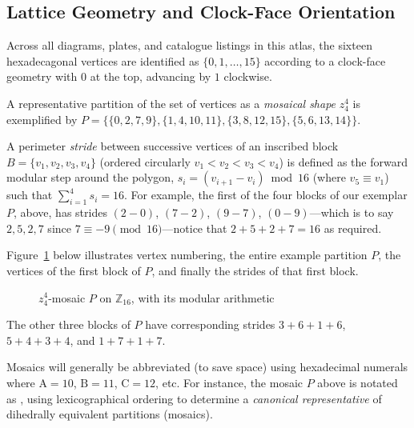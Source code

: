 \subsection{Lattice Geometry and Clock-Face Orientation}
\label{sec:clock-face-orientation}

Across all diagrams, plates, and catalogue listings in this atlas, the sixteen hexadecagonal vertices are identified as $\{0, 1, \dots, 15\}$ according to a clock-face geometry with $0$ at the top, advancing by $1$ clockwise.

A representative partition of the set of vertices as a \textit{mosaical shape} $z_4^4$ is exemplified by $P = \{\{0, 2, 7, 9\}, \{1, 4, 10, 11\}, \{3, 8, 12, 15\}, \{5, 6, 13, 14\}\}$.

A perimeter \textit{stride} between successive vertices of an inscribed block $B = \{v_1, v_2, v_3, v_4\}$ (ordered circularly $v_1 < v_2 < v_3 < v_4$) is defined as the forward modular step around the polygon, $s_i = (v_{i+1} - v_i) \bmod 16$ (where $v_5 \equiv v_1$) such that $\sum_{i=1}^4 s_i = 16$. For example, the first of the four blocks of our exemplar $P$, above, has strides $(2 - 0)$, $(7 - 2)$, $(9 - 7)$, $(0 - 9)$---which is to say $2, 5, 2, 7$ since $7 \equiv -9 \pmod{16}$---notice that $2 + 5 + 2 + 7 = 16$ as required.

Figure~\ref{fig:clock-face-convention} below illustrates vertex numbering, the entire example partition $P$, the vertices of the first block of $P$, and finally the strides of that first block.

\begin{figure}[htbp]
\centering

\caption{\label{fig:clock-face-convention}$z_4^4$-mosaic $P$ on $\mathbb{Z}_{16}$, with its modular arithmetic}
\end{figure}

The other three blocks of $P$ have corresponding strides $3 + 6 + 1 + 6$, $5 + 4 + 3 + 4$, and $1 + 7 + 1 + 7$.

Mosaics will generally be abbreviated (to save space) using hexadecimal numerals where $\mathrm{A}=10$, $\mathrm{B}=11$, $\mathrm{C}=12$, etc. For instance, the mosaic $P$ above is notated as , using lexicographical ordering to determine a \textit{canonical representative} of dihedrally equivalent partitions (mosaics).
